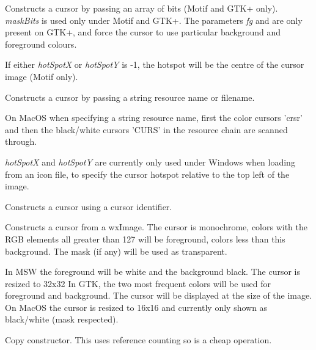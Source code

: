 Constructs a cursor by passing an array of bits (Motif and GTK+ only). {\it maskBits} is used only under
Motif and GTK+. The parameters {\it fg} and {\bg } are only present on GTK+, and force the
cursor to use particular background and foreground colours.

If either {\it hotSpotX} or {\it hotSpotY} is -1, the hotspot will be the centre of the cursor image (Motif only).


Constructs a cursor by passing a string resource name or filename.

On MacOS when specifying a string resource name, first the color cursors 'crsr' and then the black/white cursors 'CURS' in the resource chain are scanned through.

{\it hotSpotX} and {\it hotSpotY} are currently only used under Windows when loading from an
icon file, to specify the cursor hotspot relative to the top left of the image.


Constructs a cursor using a cursor identifier.


Constructs a cursor from a wxImage. The cursor is monochrome, colors with the RGB elements all greater
than 127 will be foreground, colors less than this background. The mask (if any) will be used as transparent.

In MSW the foreground will be white and the background black. The cursor is resized to 32x32
In GTK, the two most frequent colors will be used for foreground and background. The cursor will be displayed
at the size of the image.
On MacOS the cursor is resized to 16x16 and currently only shown as black/white (mask respected).


Copy constructor. This uses reference counting so is a cheap operation.






